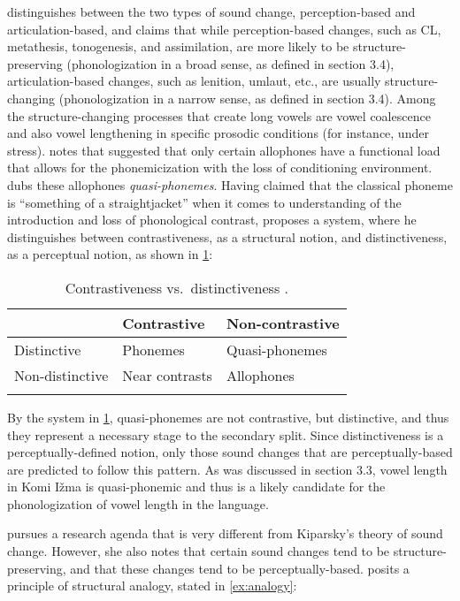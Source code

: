 \documentclass[output=paper,
modfonts
]{LSP/langsci}
\begin{document}
\citet{kiparsky2003} distinguishes between the two types of sound change,
perception-based and articulation-based, and claims that while
perception-based changes, such as CL, metathesis, tonogenesis, and
assimilation, are more likely to be structure-preserving
(phonologization in a broad sense, as defined in section 3.4),
articulation-based changes, such as lenition, umlaut, etc., are usually
structure-changing (phonologization in a narrow sense, as defined in
section 3.4). Among the structure-changing processes that create long
vowels are vowel coalescence and also vowel lengthening in specific
prosodic conditions (for instance, under stress). \citet[329]{kiparsky2003}
notes that \citet[333--335]{korhonen1969} suggested that only certain
allophones have a functional load that allows for the phonemicization
with the loss of conditioning environment. \citet{korhonen1969} dubs these
allophones \emph{quasi-phonemes}. Having claimed that the classical
phoneme is ``something of a straightjacket'' when it comes to
understanding of the introduction and loss of phonological contrast,
\citet{kiparsky2013k} proposes a system, where he distinguishes between
contrastiveness, as a structural notion, and distinctiveness, as a
perceptual notion, as shown in \cref{tab:contrast}:

\begin{table}
\caption{Contrastiveness vs.\ distinctiveness \citep{kiparsky2013k}.}
\label{tab:contrast}
\begin{tabular}{lll}
\lsptoprule
& Contrastive & Non-contrastive\tabularnewline
\midrule
Distinctive & Phonemes & Quasi-phonemes\tabularnewline
Non-distinctive & Near contrasts & Allophones\tabularnewline
\lspbottomrule
\end{tabular}
\end{table}

By the system in \cref{tab:contrast}, quasi-phonemes are not contrastive, but
distinctive, and thus they represent a necessary stage to the secondary
split. Since distinctiveness is a perceptually-defined notion, only
those sound changes that are perceptually-based are predicted to follow
this pattern. As was discussed in section 3.3, vowel length in Komi Ižma
is quasi-phonemic and thus is a likely candidate for the phonologization
of vowel length in the language.

\citet{blevins2004a,blevins2009k} pursues a research agenda that is very different
from Kiparsky's theory of sound change. However, she also notes that
certain sound changes tend to be structure-preserving, and that these
changes tend to be perceptually-based. \citet{blevins2004a} posits a
principle of structural analogy, stated in \cref{ex:analogy}:
\end{document}
